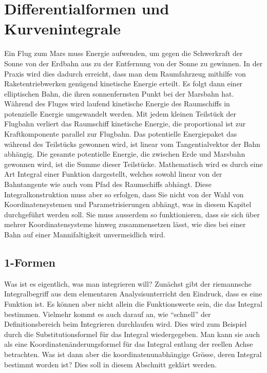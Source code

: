 %
%
%
\chapter{Differentialformen und Kurvenintegrale
\label{chapter:kurvenintegral}}
Ein Flug zum Mars muss Energie aufwenden, um gegen die Schwerkraft der
Sonne von der Erdbahn aus zu der 
Entfernung von der Sonne zu gewinnen.
In der Praxis wird dies dadurch erreicht, dass man dem Raumfahrzeug
mithilfe von Raketentriebwerken genügend kinetische Energie erteilt.
Es folgt dann einer elliptischen Bahn, die ihren sonnenfernsten Punkt
bei der Marsbahn hat.
Während des Fluges wird laufend kinetische Energie des Raumschiffs in
potenzielle Energie umgewandelt werden.
Mit jedem kleinen Teilstück der Flugbahn verliert das Raumschiff 
kinetische Energie, die proportional ist zur Kraftkomponente parallel
zur Flugbahn. 
Das potentielle Energiepaket das während des Teilstücks gewonnen wird,
ist linear vom Tangentialvektor der Bahn abhängig.
Die gesamte potentielle Energie, die zwischen Erde und Marsbahn
gewonnen wird, ist die Summe dieser Teilstücke.
Mathematisch wird es durch eine Art Integral einer Funktion dargestellt,
welches sowohl linear von der Bahntangente wie auch vom Pfad des
Raumschiffs abhängt.
Diese Integralkonstruktion muss aber so erfolgen, dass Sie nicht von der
Wahl von Koordinatensystemen und Parametrisierungen abhängt, was in
diesem Kapitel durchgeführt werden soll.
Sie muss ausserdem so funktionieren, dass sie sich über mehrer
Koordinatensysteme hinweg zusammensetzen lässt, wie dies bei einer
Bahn auf einer Mannifaltigkeit unvermeidlich wird.

%
%
\section{1-Formen}
Was ist es eigentlich, was man integrieren will?
Zunächst gibt der riemannsche Integralbegriff aus dem elementaren
Analysisunterricht den Eindruck, dass es eine Funktion ist.
Es können aber nicht allein die Funktionswerte sein, die das Integral
bestimmen.
Vielmehr kommt es auch darauf an, wie ``schnell'' der Definitionsbereich
beim Integrieren durchlaufen wird.
Dies wird zum Beispiel durch die Substitutionsformel für das Integral
wiedergegeben.
Man kann sie auch als eine Koordinatenänderungsformel für das Integral
entlang der reellen Achse betrachten.
Was ist dann aber die koordinatenunabhängige Grösse, deren Integral
bestimmt worden ist?
Dies soll in diesem Abschnitt geklärt werden.

